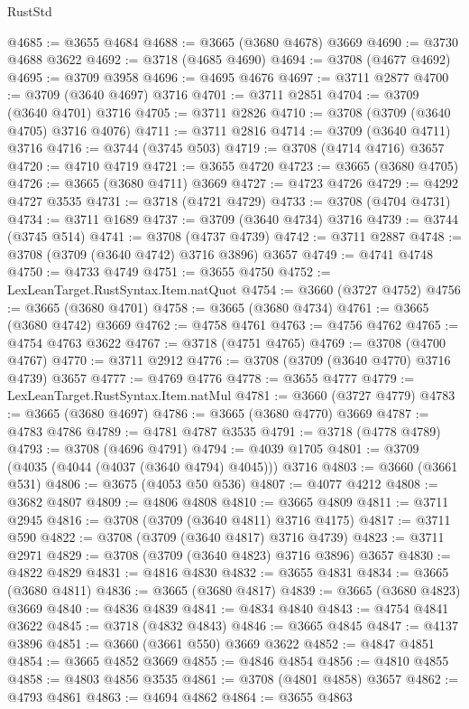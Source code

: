 \begin{lexlean}{RustStd}
\begin{coremodule}
@4685 := @3655 @4684
@4688 := @3665 (@3680 @4678) @3669
@4690 := @3730 @4688 @3622
@4692 := @3718 (@4685 @4690)
@4694 := @3708 (@4677 @4692)
@4695 := @3709 @3958
@4696 := @4695 @4676
@4697 := @3711 @2877
@4700 := @3709 (@3640 @4697) @3716
@4701 := @3711 @2851
@4704 := @3709 (@3640 @4701) @3716
@4705 := @3711 @2826
@4710 := @3708 (@3709 (@3640 @4705) @3716 @4076)
@4711 := @3711 @2816
@4714 := @3709 (@3640 @4711) @3716
@4716 := @3744 (@3745 @503)
@4719 := @3708 (@4714 @4716) @3657
@4720 := @4710 @4719
@4721 := @3655 @4720
@4723 := @3665 (@3680 @4705)
@4726 := @3665 (@3680 @4711) @3669
@4727 := @4723 @4726
@4729 := @4292 @4727 @3535
@4731 := @3718 (@4721 @4729)
@4733 := @3708 (@4704 @4731)
@4734 := @3711 @1689
@4737 := @3709 (@3640 @4734) @3716
@4739 := @3744 (@3745 @514)
@4741 := @3708 (@4737 @4739)
@4742 := @3711 @2887
@4748 := @3708 (@3709 (@3640 @4742) @3716 @3896) @3657
@4749 := @4741 @4748
@4750 := @4733 @4749
@4751 := @3655 @4750
@4752 := LexLeanTarget.RustSyntax.Item.natQuot
@4754 := @3660 (@3727 @4752)
@4756 := @3665 (@3680 @4701)
@4758 := @3665 (@3680 @4734)
@4761 := @3665 (@3680 @4742) @3669
@4762 := @4758 @4761
@4763 := @4756 @4762
@4765 := @4754 @4763 @3622
@4767 := @3718 (@4751 @4765)
@4769 := @3708 (@4700 @4767)
@4770 := @3711 @2912
@4776 := @3708 (@3709 (@3640 @4770) @3716 @4739) @3657
@4777 := @4769 @4776
@4778 := @3655 @4777
@4779 := LexLeanTarget.RustSyntax.Item.natMul
@4781 := @3660 (@3727 @4779)
@4783 := @3665 (@3680 @4697)
@4786 := @3665 (@3680 @4770) @3669
@4787 := @4783 @4786
@4789 := @4781 @4787 @3535
@4791 := @3718 (@4778 @4789)
@4793 := @3708 (@4696 @4791)
@4794 := @4039 @1705
@4801 := @3709 (@4035 (@4044 (@4037 (@3640 @4794) @4045))) @3716
@4803 := @3660 (@3661 @531)
@4806 := @3675 (@4053 @50 @536)
@4807 := @4077 @4212
@4808 := @3682 @4807
@4809 := @4806 @4808
@4810 := @3665 @4809
@4811 := @3711 @2945
@4816 := @3708 (@3709 (@3640 @4811) @3716 @4175)
@4817 := @3711 @590
@4822 := @3708 (@3709 (@3640 @4817) @3716 @4739)
@4823 := @3711 @2971
@4829 := @3708 (@3709 (@3640 @4823) @3716 @3896) @3657
@4830 := @4822 @4829
@4831 := @4816 @4830
@4832 := @3655 @4831
@4834 := @3665 (@3680 @4811)
@4836 := @3665 (@3680 @4817)
@4839 := @3665 (@3680 @4823) @3669
@4840 := @4836 @4839
@4841 := @4834 @4840
@4843 := @4754 @4841 @3622
@4845 := @3718 (@4832 @4843)
@4846 := @3665 @4845
@4847 := @4137 @3896
@4851 := @3660 (@3661 @550) @3669 @3622
@4852 := @4847 @4851
@4854 := @3665 @4852 @3669
@4855 := @4846 @4854
@4856 := @4810 @4855
@4858 := @4803 @4856 @3535
@4861 := @3708 (@4801 @4858) @3657
@4862 := @4793 @4861
@4863 := @4694 @4862
@4864 := @3655 @4863

\end{coremodule}
\end{lexlean}
